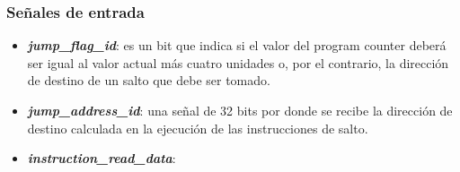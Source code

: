\subsubsection{Señales de entrada}

\begin{itemize}
  \item \textbf{\textit{jump\_flag\_id}}: es un bit que indica si el valor del program counter deberá ser igual al valor actual más cuatro unidades o, por el contrario, la dirección de destino de un salto que debe ser tomado.
  \vspace{-0.2cm}
  \item \textbf{\textit{jump\_address\_id}}: una señal de 32 bits por donde se recibe la dirección de destino calculada en la ejecución de las instrucciones de salto.
  \vspace{-0.2cm}
  \item \textbf{\textit{instruction\_read\_data}}:
\end{itemize}